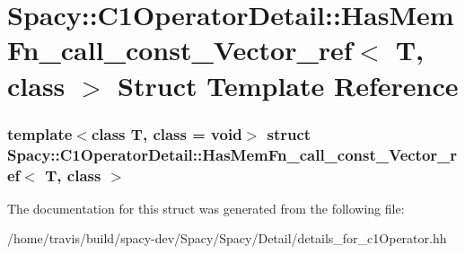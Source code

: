 \hypertarget{structSpacy_1_1C1OperatorDetail_1_1HasMemFn__call__const__Vector__ref}{\section{\-Spacy\-:\-:\-C1\-Operator\-Detail\-:\-:\-Has\-Mem\-Fn\-\_\-call\-\_\-const\-\_\-\-Vector\-\_\-ref$<$ \-T, class $>$ \-Struct \-Template \-Reference}
\label{structSpacy_1_1C1OperatorDetail_1_1HasMemFn__call__const__Vector__ref}
}
\subsubsection*{template$<$class T, class = void$>$ struct Spacy\-::\-C1\-Operator\-Detail\-::\-Has\-Mem\-Fn\-\_\-call\-\_\-const\-\_\-\-Vector\-\_\-ref$<$ T, class $>$}



\-The documentation for this struct was generated from the following file\-:\begin{DoxyCompactItemize}
\item 
/home/travis/build/spacy-\/dev/\-Spacy/\-Spacy/\-Detail/details\-\_\-for\-\_\-c1\-Operator.\-hh\end{DoxyCompactItemize}

